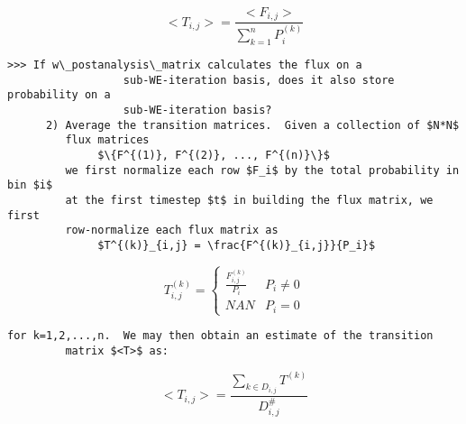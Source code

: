 \documentclass[10pt]{article}
\begin{document}
               \[<T_{i,j}> = \frac{<F_{i,j}>}{\sum_{k=1}^n P^{(k)}_i} \] 

\begin{Verbatim}[commandchars=\\\{\},codes={\catcode`$=3\catcode`^=7\catcode`_=8}]
              >>> If w\_postanalysis\_matrix calculates the flux on a 
                  sub-WE-iteration basis, does it also store probability on a 
                  sub-WE-iteration basis? 
      2) Average the transition matrices.  Given a collection of $N*N$ 
         flux matrices 
              $\{F^{(1)}, F^{(2)}, ..., F^{(n)}\}$
         we first normalize each row $F_i$ by the total probability in bin $i$
         at the first timestep $t$ in building the flux matrix, we first 
         row-normalize each flux matrix as 
              $T^{(k)}_{i,j} = \frac{F^{(k)}_{i,j}}{P_i}$
\end{Verbatim}
               
               \[T^{(k)}_{i,j} = \begin{cases} 
                                   \frac{F^{(k)}_{i,j}}{P_i} & P_i \neq 0 \\
                                   NAN & P_i=0 
                                 \end{cases}
                              \]
\begin{Verbatim}[commandchars=\\\{\},codes={\catcode`$=3\catcode`^=7\catcode`_=8}]
         for k=1,2,...,n.  We may then obtain an estimate of the transition
         matrix $<T>$ as:
\end{Verbatim}
              \[<T_{i,j}> = \frac{\sum_{k\in D_{i,j}} T^{(k)}}{D_{i,j}^\#} \]
              
\end{document}
